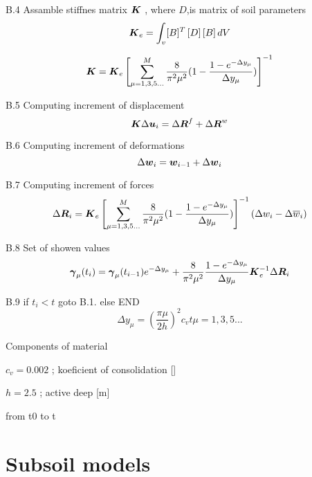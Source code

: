 B.4  Assamble stiffnes matrix $\mbox{\boldmath$K$}$ , where $D$,is matrix of soil parameters
\begin{equation}
\mbox{\boldmath$K$}_e = \int_v^{}[B]^T 
\left[D \right]
\left[B \right]dV
\end{equation}
     
\begin{equation}
\mbox{\boldmath$K$} = \mbox{\boldmath$K$}_e \left[ \sum_{\mu=1,3,5...}^{M} \frac{8}{\pi^2 \mu^2}
(1 - \frac{1-e^{-\Delta y_{\mu}}} {\Delta y_{\mu}}) \right]^{-1} 
\end{equation}
     
B.5 Computing increment of displacement
\begin{equation}
\mbox{\boldmath$K$} \Delta  \mbox{\boldmath$u$}_i = \Delta \mbox{\boldmath$R$}^f + \Delta \mbox{\boldmath$R$}^w
\end{equation}


B.6 Computing increment of deformations
\begin{equation}
\Delta\mbox{\boldmath$w$}_i = \mbox{\boldmath$w$}_{i-1} + \Delta \mbox{\boldmath$w$}_i
\end{equation}


B.7 Computing increment of forces
\begin{equation}
\Delta\mbox{\boldmath$R$}_i = {\mbox{\boldmath$K$}_e} \left[ {\sum_{\mu=1,3,5...}^{M} \frac{8}{\pi^2\mu^2}(1-\frac{1-e^{-\Delta y_\mu}} {\Delta y_\mu } )} \right]^{-1} 
(\Delta w_i-\Delta\overline{w}_i)
\end{equation}


B.8 Set of showen values
\begin{equation}
\mbox{\boldmath$\gamma$}_\mu(t_i) = \mbox{\boldmath$\gamma$}_\mu (t_{i-1}) e^{-\Delta y_\mu} + \frac{8} {\pi^2\mu^2}
{\frac{1-e^{-\Delta y_\mu}}{\Delta y_\mu} } \mbox{\boldmath$K$}^{-1}_e \Delta\mbox{\boldmath$R$}_i
\end{equation}


B.9  if $t_i<t$ goto B.1. else END
\\


\begin{equation}
\Delta y_\mu = (\frac{\pi\mu}{2h} )^2 c_v t   {\mu=1,3,5...}
\end{equation}


Components of material



  $c_v = 0.002$ ;    koeficient of consolidation []
  
  $h= 2.5$ ;       active deep [m]


  from t0  to t 


\section{Subsoil models}

